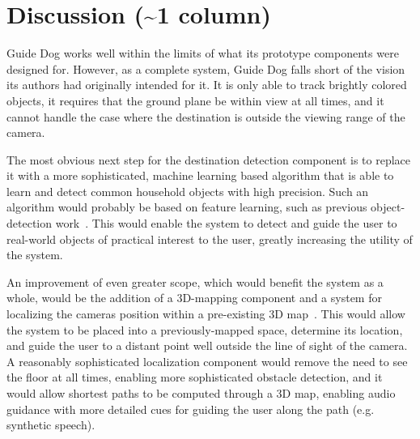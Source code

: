 \section{Discussion (\textasciitilde 1 column)}
\label{sec:discussion}

Guide Dog works well within the limits of what its prototype components were
designed for. However, as a complete system, Guide Dog falls short of the 
vision its authors had originally intended for it. It is only able to track
brightly colored objects, it requires that the ground plane be within view
at all times, and it cannot handle the case where the destination is outside
the viewing range of the camera. 

The most obvious next step for the destination detection component is to
replace it with a more sophisticated, machine learning based algorithm that
is able to learn and detect common household objects with high precision.
Such an algorithm would probably be based on feature learning, such as
previous object-detection work~\cite{lai_icra12}.
This would enable the system to detect and guide the user to real-world
objects of practical interest to the user, greatly increasing the
utility of the system.

An improvement of even greater scope, which would benefit the system as
a whole, would be the addition of a 3D-mapping component and a system
for localizing the cameras position within a pre-existing 3D map~\cite{Du:2011:IMI:2030112.2030123}. This
would allow the system to be placed into a previously-mapped space,
determine its location, and guide the user to a distant point well
outside the line of sight of the camera. A reasonably sophisticated 
localization component would remove the need to see the floor at all
times, enabling more sophisticated obstacle detection, and it would 
allow shortest paths to be computed through a 3D map, enabling audio
guidance with more detailed cues for guiding the user along the path
(e.g. synthetic speech).
